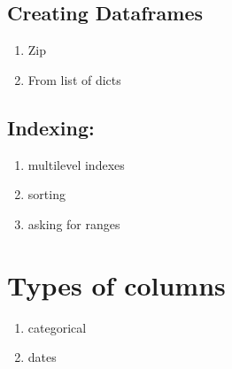 \documentclass[
  letterpaper,
  DIV=11,
  numbers=noendperiod]{scrreprt}
\providecommand{\tightlist}{%
  \setlength{\itemsep}{0pt}\setlength{\parskip}{0pt}}\usepackage{longtable,booktabs,array}
\begin{document}
\hypertarget{creating-dataframes}{%
\subsection{Creating Dataframes}\label{creating-dataframes}}

\begin{enumerate}
\def\labelenumi{\arabic{enumi}.}
\tightlist
\item
  Zip
\item
  From list of dicts
\end{enumerate}

\hypertarget{indexing}{%
\subsection{Indexing:}\label{indexing}}

\begin{enumerate}
\def\labelenumi{\arabic{enumi}.}
\tightlist
\item
  multilevel indexes
\item
  sorting
\item
  asking for ranges
\end{enumerate}

\hypertarget{types-of-columns}{%
\section{Types of columns}\label{types-of-columns}}

\begin{enumerate}
\def\labelenumi{\arabic{enumi}.}
\tightlist
\item
  categorical
\item
  dates
\end{enumerate}
\end{document}
